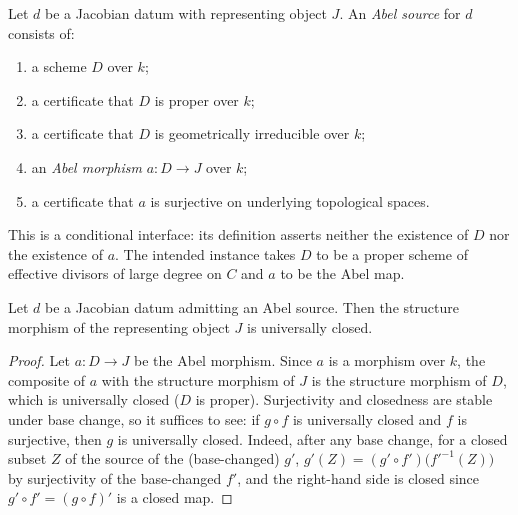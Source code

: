 \begin{definition}
  \label{pa-def:abel_source}
  \leanok

  Let \(d\) be a Jacobian datum with representing object \(J\). An
  \emph{Abel source} for \(d\) consists of:
  \begin{enumerate}
    \item a scheme \(D\) over \(k\);
    \item a certificate that \(D\) is proper over \(k\);
    \item a certificate that \(D\) is geometrically irreducible over \(k\);
    \item an \emph{Abel morphism} \(a : D \to J\) over \(k\);
    \item a certificate that \(a\) is surjective on underlying topological
      spaces.
  \end{enumerate}
  This is a conditional interface: its definition asserts neither the
  existence of \(D\) nor the existence of \(a\). The intended instance takes
  \(D\) to be a proper scheme of effective divisors of large degree on \(C\)
  and \(a\) to be the Abel map.
\end{definition}

\begin{theorem}
  \label{pa-thm:jacobianData_universallyClosed}
  \leanok

  Let \(d\) be a Jacobian datum admitting an Abel source. Then the structure
  morphism of the representing object \(J\) is universally closed.
\end{theorem}
\begin{proof}
  \leanok
  Let \(a : D \to J\) be the Abel morphism. Since \(a\) is a morphism over
  \(k\), the composite of \(a\) with the structure morphism of \(J\) is the
  structure morphism of \(D\), which is universally closed (\(D\) is proper).
  Surjectivity and closedness are stable under base change, so it suffices to
  see: if \(g \circ f\) is universally closed and \(f\) is surjective, then
  \(g\) is universally closed. Indeed, after any base change, for a closed
  subset \(Z\) of the source of the (base-changed) \(g'\),
  \(g'(Z) = (g' \circ f')\bigl(f'^{-1}(Z)\bigr)\) by surjectivity of the
  base-changed \(f'\), and the right-hand side is closed since
  \(g' \circ f' = (g \circ f)'\) is a closed map.
\end{proof}

